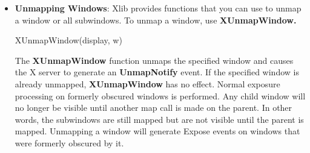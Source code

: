 \documentclass{report}
\begin{document}
\begin{itemize}
            \bigbreak \noindent 
            To map and raise a window, use \textbf{XMapRaised.}
            \bigbreak \noindent 
            \begin{cppcode}
            XMapRaised (display, w)
            \end{cppcode}
            \bigbreak \noindent 
            The \textbf{XMapRaised} function essentially is similar to \textbf{XMapWindow} in that it maps the window and all of its subwindows that have had map requests. However, it also raises the specified window to the top of the stack. 
            \bigbreak \noindent 
            \textbf{XMapRaised} can generate multiple \textbf{BadWindow} errors.
            \bigbreak \noindent 
            To map all subwindows for a specified window, use \textbf{XMapSubwindows.}
            \bigbreak \noindent 
            \begin{cppcode}
                XMapSubwindows (display, w)
            \end{cppcode}
            \bigbreak \noindent 
            The \textbf{XMapSubwindows} function maps all subwindows for a specified window in top-to-bottom stacking order. The X server generates Expose events on each newly displayed window. This may be much more efficient than mapping many windows one at a time because the server needs to perform much of the work only once, for all of the windows, rather than for each window.
            \bigbreak \noindent 
            \textbf{XMapSubwindows} can generate a \textbf{BadWindow} error.
        \item \textbf{Unmapping Windows}: Xlib provides functions that you can use to unmap a window or all subwindows.
            \bigbreak \noindent 
            To unmap a window, use \textbf{XUnmapWindow.}
            \bigbreak \noindent 
            \begin{cppcode}
                XUnmapWindow(display, w)
            \end{cppcode}
            \bigbreak \noindent 
            The \textbf{XUnmapWindow} function unmaps the specified window and causes the X server to generate an \textbf{UnmapNotify} event. If the specified window is already unmapped, \textbf{XUnmapWindow} has no effect. Normal exposure processing on formerly obscured windows is performed. Any child window will no longer be visible until another map call is made on the parent. In other words, the subwindows are still mapped but are not visible until the parent is mapped. Unmapping a window will generate Expose events on windows that were formerly obscured by it. 

\end{itemize}
\end{document}
